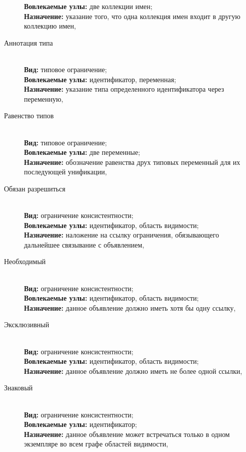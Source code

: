 \begin{description}
        \textbf{Вовлекаемые узлы:} две коллекции имен; \\
        \textbf{Назначение:} указание того, что одна коллекция
        имен входит в другую коллекцию имен, 
    \item[Аннотация типа] \
        \\
        \textbf{Вид:} типовое ограничение; \\
        \textbf{Вовлекаемые узлы:} идентификатор, переменная; \\
        \textbf{Назначение:} указание типа определенного
        идентификатора через переменную, 
    \item[Равенство типов] \
        \\
        \textbf{Вид:} типовое ограничение; \\
        \textbf{Вовлекаемые узлы:} две переменные; \\
        \textbf{Назначение:} обозначение равенства друх типовых 
        переменный для их последующей унификации, 
    \item[Обязан разрешиться] \
        \\
        \textbf{Вид:} ограничение консистентности; \\
        \textbf{Вовлекаемые узлы:} идентификатор, область видимости; \\
        \textbf{Назначение:} наложение на ссылку ограничения, обязывающего дальнейшее
        связывание с объявлением, 
    \item[Необходимый] \
        \\
        \textbf{Вид:} ограничение консистентности; \\
        \textbf{Вовлекаемые узлы:} идентификатор, область видимости; \\
        \textbf{Назначение:} данное объявление должно иметь хотя бы одну ссылку, 
    \item[Эксклюзивный] \
        \\
        \textbf{Вид:} ограничение консистентности; \\
        \textbf{Вовлекаемые узлы:} идентификатор, область видимости; \\
        \textbf{Назначение:} данное объявление должно иметь не более одной ссылки, 
    \item[Знаковый] \
        \\
        \textbf{Вид:} ограничение консистентности; \\
        \textbf{Вовлекаемые узлы:} идентификатор; \\
        \textbf{Назначение:} данное объявление может встречаться только
        в одном экземпляре во всем графе областей видимости, 
\end{description}

